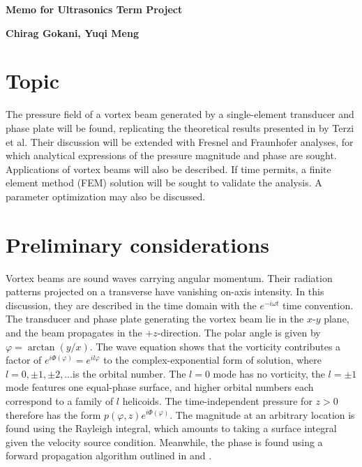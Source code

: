 \documentclass[12pt]{article}%
\begin{document}
\begin{center}
\begin{Large}
\textbf{Memo for Ultrasonics Term Project}\\
\end{Large}
\textbf{Chirag Gokani, Yuqi Meng}

\end{center}


\section*{Topic} 

The pressure field of a vortex beam generated by a single-element transducer and phase plate will be found, replicating the theoretical results presented in \cite{ref1} by Terzi et al. Their discussion will be extended with Fresnel and Fraunhofer analyses, for which analytical expressions of the pressure magnitude and phase are sought. Applications of vortex beams will also be described. If time permits, a finite element method (FEM) solution will be sought to validate the analysis. A parameter optimization may also be discussed.



\section*{Preliminary considerations}
Vortex beams are sound waves carrying angular momentum. Their radiation patterns projected on a transverse have vanishing on-axis intensity. In this discussion, they are described in the time domain with the $e^{-i \omega t}$ time convention. The transducer and phase plate generating the vortex beam lie in the $x$-$y$ plane, and the beam propagates in the $+z$-direction. The polar angle is given by $\varphi = \arctan (y/x)$. The wave equation shows that the vorticity contributes a factor of ${e}^{i\Phi(\varphi) } = {{e}^{il\varphi }}$ to the complex-exponential form of solution, where $l = 0, \pm1, \pm2,\dots$is the orbital number. The $l=0$ mode has no vorticity, the $l= \pm1$ mode features one equal-phase surface, and higher orbital numbers each correspond to a family of $l$ helicoids. The time-independent pressure for $z> 0$ therefore has the form $p(\varphi,z)e^{i\Phi(\varphi)}$. The magnitude at an arbitrary location is found using the Rayleigh integral, which amounts to taking a surface integral given the velocity source condition. Meanwhile, the phase is found using a forward propagation algorithm outlined in \cite{ref2} and \cite{ref5}.
\end{document}
